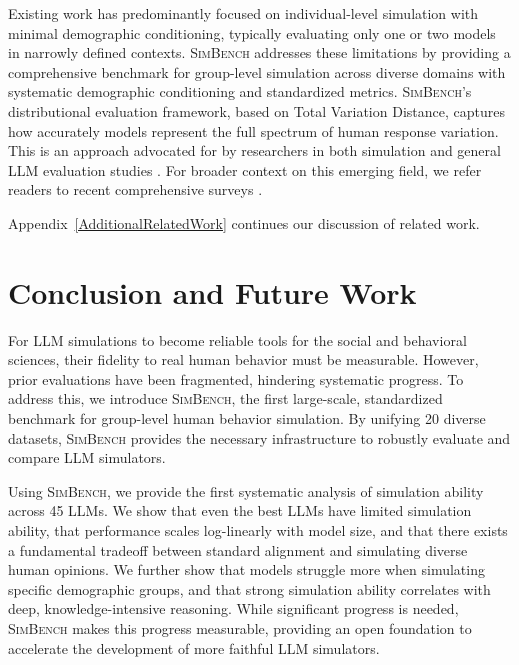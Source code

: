 \documentclass{article} %
\begin{document}
Existing work has predominantly focused on individual-level simulation with minimal demographic conditioning, typically evaluating only one or two models in narrowly defined contexts. \textsc{SimBench} addresses these limitations by providing a comprehensive benchmark for group-level simulation across diverse domains with systematic demographic conditioning and standardized metrics. \textsc{SimBench}'s distributional evaluation framework, based on Total Variation Distance, captures how accurately models represent the full spectrum of human response variation. This is an approach advocated for by researchers in both simulation \citep{anthis2025llm} and general LLM evaluation studies \citep{ying2025benchmarking}. For broader context on this emerging field, we refer readers to recent comprehensive surveys \citep{ma-etal-2024-potential, kozlowski2024simulating, olteanu2025ai, anthis2025llm}.



Appendix~\ref{AdditionalRelatedWork} continues our discussion of related work.



\section{Conclusion and Future Work}
\label{sec: conclusion}

For LLM simulations to become reliable tools for the social and behavioral sciences, their fidelity to real human behavior must be measurable. However, prior evaluations have been fragmented, hindering systematic progress. To address this, we introduce \textsc{SimBench}, the first large-scale, standardized benchmark for group-level human behavior simulation. By unifying 20 diverse datasets, \textsc{SimBench} provides the necessary infrastructure to robustly evaluate and compare LLM simulators.

Using \textsc{SimBench}, we provide the first systematic analysis of simulation ability across 45 LLMs.
We show that even the best LLMs have limited simulation ability, that performance scales log-linearly with model size, and that there exists a fundamental tradeoff between standard alignment and simulating diverse human opinions. We further show that models struggle more when simulating specific demographic groups, and that strong simulation ability correlates with deep, knowledge-intensive reasoning. While significant progress is needed, \textsc{SimBench} makes this progress measurable, providing an open foundation to accelerate the development of more faithful LLM simulators.
\end{document}
